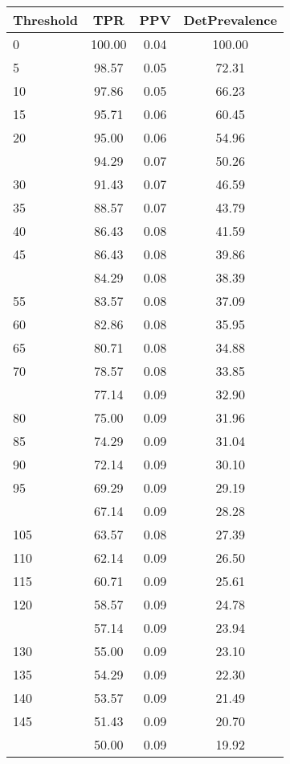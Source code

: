 \begin{table}[ht]
\centering
\begin{tabular}{lccc}
  \toprule
Threshold & TPR & PPV & DetPrevalence \\ 
  \midrule
0 & 100.00 & 0.04 & 100.00 \\ 
  5 & 98.57 & 0.05 & 72.31 \\ 
  10 & 97.86 & 0.05 & 66.23 \\ 
  15 & 95.71 & 0.06 & 60.45 \\ 
  20 & 95.00 & 0.06 & 54.96 \\ 
   \addlinespace
25 & 94.29 & 0.07 & 50.26 \\ 
  30 & 91.43 & 0.07 & 46.59 \\ 
  35 & 88.57 & 0.07 & 43.79 \\ 
  40 & 86.43 & 0.08 & 41.59 \\ 
  45 & 86.43 & 0.08 & 39.86 \\ 
   \addlinespace
50 & 84.29 & 0.08 & 38.39 \\ 
  55 & 83.57 & 0.08 & 37.09 \\ 
  60 & 82.86 & 0.08 & 35.95 \\ 
  65 & 80.71 & 0.08 & 34.88 \\ 
  70 & 78.57 & 0.08 & 33.85 \\ 
   \addlinespace
75 & 77.14 & 0.09 & 32.90 \\ 
  80 & 75.00 & 0.09 & 31.96 \\ 
  85 & 74.29 & 0.09 & 31.04 \\ 
  90 & 72.14 & 0.09 & 30.10 \\ 
  95 & 69.29 & 0.09 & 29.19 \\ 
   \addlinespace
100 & 67.14 & 0.09 & 28.28 \\ 
  105 & 63.57 & 0.08 & 27.39 \\ 
  110 & 62.14 & 0.09 & 26.50 \\ 
  115 & 60.71 & 0.09 & 25.61 \\ 
  120 & 58.57 & 0.09 & 24.78 \\ 
   \addlinespace
125 & 57.14 & 0.09 & 23.94 \\ 
  130 & 55.00 & 0.09 & 23.10 \\ 
  135 & 54.29 & 0.09 & 22.30 \\ 
  140 & 53.57 & 0.09 & 21.49 \\ 
  145 & 51.43 & 0.09 & 20.70 \\ 
   \addlinespace
150 & 50.00 & 0.09 & 19.92 \\ 

\end{tabular}
\end{table}
